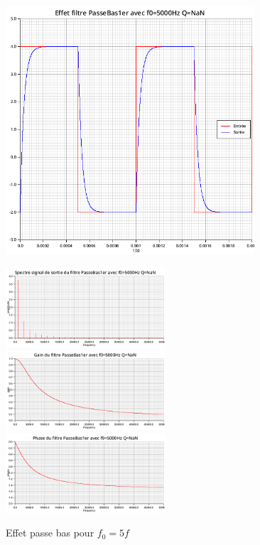 \documentclass{article}
\begin{document}
\begin{figure}[H]
  \begin{minipage}{0.6\textwidth}
      \centering
      \includegraphics[width=25em]{images/creneau/bas/5/signals.png}
  \end{minipage}
  \begin{minipage}{0.3\textwidth}
      \centering
      \includegraphics[width=16em]{images/creneau/bas/5/fft_out.png}
      \vfill
      \includegraphics[width=16em]{images/creneau/bas/5/gain.png}
      \vfill
      \includegraphics[width=16em]{images/creneau/bas/5/phase.png}
  \end{minipage}
  \caption{Effet passe bas pour $f_0=5f$}
\end{figure}
\end{document}
